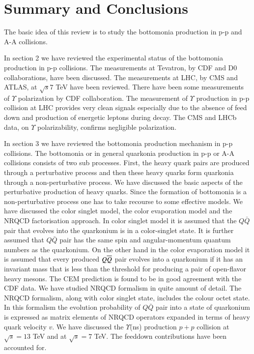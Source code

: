 \section{Summary and Conclusions}
\label{sec:conclusions}
The basic idea of this review is to study the bottomonia production in p-p and A-A collisions. 


In section 2 we have reviewed the experimental status of the bottomonia production in p-p collisions. The 
measurements at Tevatron, by CDF and D0 collaborations, have been discussed. The measurements at 
LHC, by CMS and ATLAS, at ${\sqrt s} 7$ TeV have been reviewed. There have been some measurements 
of $\Upsilon$ polarization by CDF collaboration. The measurement of $\Upsilon$ production in p-p 
collision at LHC provides very clean signals especially due to the absence of feed down and production 
of energetic leptons during decay. The CMS and LHCb data, on $\Upsilon$ polarizability, confirms 
negligible polarization. 

In section 3 we have reviewed the bottomonia production mechanism in p-p 
collisions. The bottomonia or in general quarkonia production in p-p or A-A collisions consists of two 
sub processes. First, the heavy quark pairs are produced through a perturbative process and then 
these heavy quarks form quarkonia through a non-perturbative process. We have discussed the basic 
aspects of the perturbative production of heavy quarks. Since the formation of bottomonia 
is a non-perturbative process one has to take recourse to some effective models. We have discussed the 
color singlet model, the color evaporation model and the NRQCD factorisation approach. In color singlet  
model  it is assumed that the $Q\bar Q$ pair that evolves into
the quarkonium is in a color-singlet state. It is further assumed  that  $Q\bar Q$ pair   has the same spin
and angular-momentum quantum numbers as the quarkonium. On the other hand in the color evaporation 
model   it
is assumed that every produced $Q \overline{Q}$ pair evolves into a quarkonium
if it has an invariant mass that is less than the threshold for
producing a pair of open-flavor heavy mesons. The CEM prediction is found to be in good agreement 
with the CDF data. We have studied NRQCD formalism in quite amount of detail. The NRQCD formalism, 
along with color singlet state, includes the colour octet state. In this formalism the evolution probability of $Q\bar{Q}$
pair into a state of quarkonium is expressed as matrix elements of NRQCD operators expanded
in terms of heavy quark velocity $v$. We have discussed the $\Upsilon$(ns) production $p+p$ collision 
at $\sqrt s = 13$ TeV and at $\sqrt s =7$ TeV. The feeddown contributions have been accounted for. 

